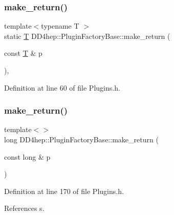 \subsubsection{\texorpdfstring{make\+\_\+return()}{make\_return()}\hspace{0.1cm}{\footnotesize\ttfamily [1/2]}}
{\footnotesize\ttfamily template$<$typename T $>$ \\
static \hyperlink{class_t}{T} D\+D4hep\+::\+Plugin\+Factory\+Base\+::make\+\_\+return (\begin{DoxyParamCaption}\item[{const \hyperlink{class_t}{T} \&}]{p }\end{DoxyParamCaption})\hspace{0.3cm}{\ttfamily [inline]}, {\ttfamily [static]}}



Definition at line 60 of file Plugins.\+h.

\hypertarget{struct_d_d4hep_1_1_plugin_factory_base_af3452006a01f31b7226067fb00c27e13}{}\label{struct_d_d4hep_1_1_plugin_factory_base_af3452006a01f31b7226067fb00c27e13} 
\subsubsection{\texorpdfstring{make\+\_\+return()}{make\_return()}\hspace{0.1cm}{\footnotesize\ttfamily [2/2]}}
{\footnotesize\ttfamily template$<$$>$ \\
long D\+D4hep\+::\+Plugin\+Factory\+Base\+::make\+\_\+return (\begin{DoxyParamCaption}\item[{const long \&}]{p }\end{DoxyParamCaption})\hspace{0.3cm}{\ttfamily [inline]}}



Definition at line 170 of file Plugins.\+h.



References s.

\hypertarget{struct_d_d4hep_1_1_plugin_factory_base_ab5cd0de7d88623c7dbf31330627ced59}{}\label{struct_d_d4hep_1_1_plugin_factory_base_ab5cd0de7d88623c7dbf31330627ced59} 
